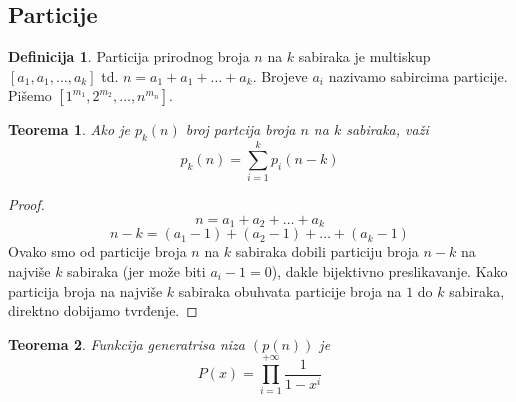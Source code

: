 \documentclass[a4paper,12pt]{article}
\numberwithin{algorithm}{section}
\theoremstyle{plain}
\newtheorem{theorem}{Teorema}[section]
\theoremstyle{definition}
\newtheorem{definition}{Definicija}[section]
\theoremstyle{remark}
\begin{document}
\subsection{Particije}
\begin{definition}
    Particija prirodnog broja $n$ na $k$ sabiraka je multiskup $[a_1, a_1, \ldots, a_k]$ td. $n = a_1 + a_1 + \ldots + a_k$. Brojeve $a_i$ nazivamo sabircima particije. Pišemo $[1^{m_1}, 2^{m_2}, \ldots, n^{m_n}]$.
\end{definition}
\newpage
\begin{theorem}
    Ako je $p_k(n)$ broj partcija broja $n$ na $k$ sabiraka, važi
    \[ p_k(n) = \sum_{i = 1}^{k} p_i(n-k) \]
    \label{10-3}
\end{theorem}
\begin{proof}
    \[ n = a_1 + a_2 + \ldots + a_k \]
    \[ n - k = (a_1 - 1) + (a_2-1) + \ldots + (a_k - 1) \]
    Ovako smo od particije broja $n$ na $k$ sabiraka dobili particiju broja $n-k$ na 
    najviše $k$ sabiraka (jer može biti $a_i - 1 = 0$), dakle bijektivno preslikavanje.
    Kako particija broja na najviše $k$ sabiraka obuhvata particije broja na $1$ do $k$ sabiraka, 
    direktno dobijamo tvrđenje.
\end{proof}
\begin{theorem}
    Funkcija generatrisa niza $(p(n))$ je
    \[ P(x) = \prod_{i = 1}^{+\infty}\frac{1}{1-x^i} \]
\end{theorem}
\vfill
\end{document}
